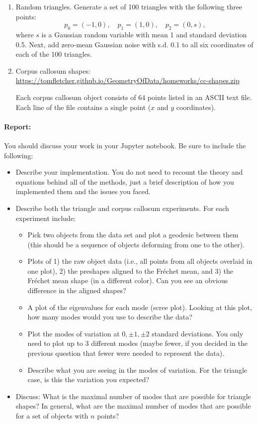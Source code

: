 \documentclass[11pt]{article}
\begin{document}
\begin{enumerate}
\item Random triangles. Generate a set of 100 triangles with the following three
points:
$$p_0 = (-1,0), \quad p_1 = (1,0), \quad p_2 = (0,s),$$
where $s$ is a Gaussian random variable with mean 1 and standard deviation 0.5.
Next, add zero-mean Gaussian noise with s.d. 0.1 to all six coordinates of each
of the 100 triangles.

\item Corpus callosum shapes:
\url{https://tomfletcher.github.io/GeometryOfData/homeworks/cc-shapes.zip}

Each corpus callosum object consists of 64 points listed in an ASCII text file.
Each line of the file contains a single point ($x$ and $y$ coordinates).
\end{enumerate}

\paragraph{Report:} You should discuss your work in your Jupyter notebook. Be
sure to include the following:
\begin{itemize}
\item Describe your implementation. You do not need to recount the theory and
equations behind all of the methods, just a brief description of how you
implemented them and the issues you faced.
\item Describe both the triangle and corpus callosum experiments. For each
experiment include:
\begin{itemize}
\item Pick two objects from the data set and plot a geodesic between them (this
should be a sequence of objects deforming from one to the other).
\item Plots of 1) the raw object data (i.e., all points from all objects
overlaid in one plot), 2) the preshapes aligned to the Fr\'{e}chet mean, and
3) the Fr\'{e}chet mean shape (in a different color). Can you see an obvious
difference in the aligned shapes?
\item A plot of the eigenvalues for each mode (scree plot). Looking at this
plot, how many modes would you use to describe the data?
\item Plot the modes of variation at $0, \pm 1, \pm 2$ standard deviations. You
only need to plot up to 3 different modes (maybe fewer, if you decided in the
previous question that fewer were needed to represent the data).
\item Describe what you are seeing in the modes of variation. For the triangle
case, is this the variation you expected?
\end{itemize}
\item Discuss: What is the maximal number of modes that are possible for
triangle shapes? In general, what are the maximal number of modes that are
possible for a set of objects with $n$ points?
\end{itemize}
\end{document}
